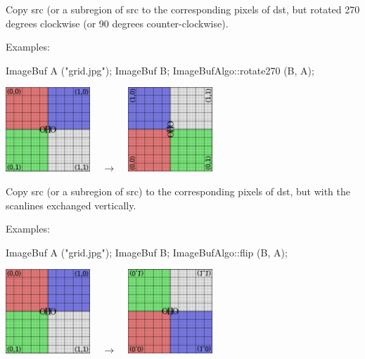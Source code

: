  
Copy {\cf src} (or a subregion of {\cf src} to the corresponding pixels
of {\cf dst}, but rotated 270 degrees clockwise (or 90 degrees
counter-clockwise).

\smallskip
\noindent Examples:
\begin{code}
    ImageBuf A ("grid.jpg");
    ImageBuf B;
    ImageBufAlgo::rotate270 (B, A);
\end{code}
\spc \includegraphics[width=1.25in]{figures/grid-small.jpg}
~ {\Huge $\rightarrow$} ~
\includegraphics[width=1.25in]{figures/rotate270.jpg} \\
\apiend


 
Copy {\cf src} (or a subregion of {\cf src}) to the corresponding pixels
of {\cf dst}, but with the scanlines exchanged vertically.

\smallskip
\noindent Examples:
\begin{code}
    ImageBuf A ("grid.jpg");
    ImageBuf B;
    ImageBufAlgo::flip (B, A);
\end{code}
\spc \includegraphics[width=1.25in]{figures/grid-small.jpg}
~ {\Huge $\rightarrow$} ~
\includegraphics[width=1.25in]{figures/flip.jpg} \\
\apiend


